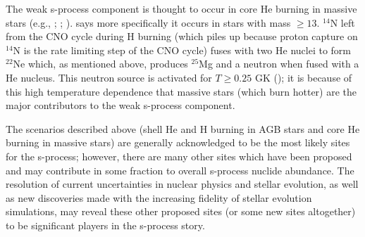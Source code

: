 The weak s-process component is thought to occur in core He burning in
massive stars
(e.g., \citealt{peters1968}; \citealt{couch1974}; \citealt{raiteri1991}).
\cite{iliadis2008} says more specifically it occurs in stars with mass
$\geq13$\Msol.  $^{14}$N left from the CNO cycle during H burning
(which piles up because proton capture on $^{14}$N is the rate
limiting step of the CNO cycle) fuses with two He nuclei to form
$^{22}$Ne which, as mentioned above, produces $^{25}$Mg and a neutron
when fused with a He nucleus.  This neutron source is activated for
$T \geq 0.25$ GK (\citealt{iliadis2008}); it is because of this high
temperature dependence that massive stars (which burn hotter) are the
major contributors to the weak s-process component.  

The scenarios described above (shell He and H burning in AGB stars and
core He burning in massive stars) are generally acknowledged to be the
most likely sites for the s-process; however, there are many other
sites which have been proposed and may contribute in some fraction to
overall s-process nuclide abundance.  The resolution of current
uncertainties in nuclear physics and stellar evolution, as well as new
discoveries made with the increasing fidelity of stellar evolution
simulations, may reveal these other proposed sites (or some new sites
altogether) to be significant players in the s-process story.

